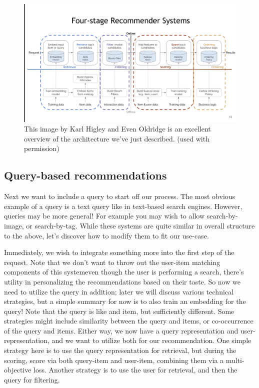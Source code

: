 \begin{figure}[h!]
    \caption{This image by Karl Higley and Even Oldridge is an excellent overview of the architecture we've just described. (used with permission)}
    \includegraphics[width=\textwidth-10pt]{book-text/four-stage-diagram.png}
\end{figure}

\subsection{Query-based recommendations}

Next we want to include a query to start off our process. The most obvious example of a query is a text query like in text-based search engines. However, queries may be more general! For example you may wish to allow search-by-image, or search-by-tag. While these systems are quite similar in overall structure to the above, let's discover how to modify them to fit our use-case.

Immediately, we wish to integrate something more into the first step of the request. Note that we don't want to throw out the user-item matching components of this system\textemdash even though the user is performing a search, there's utility in personalizing the recommendations based on their taste. So now we need to utilize the query in addition; later we will discuss various technical strategies, but a simple summary for now is to also train an embedding for the query! Note that the query is like and item, but sufficiently different. Some strategies might include similarity between the query and items, or co-occurrence of the query and items. Either way, we now have a query representation and user-representation, and we want to utilize both for our recommendation. One simple strategy here is to use the query representation for retrieval, but during the scoring, score via both query-item and user-item, combining them via a multi-objective loss. Another strategy is to use the user for retrieval, and then the query for filtering. 

